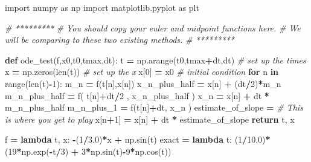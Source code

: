 \documentclass[
]{book}
\newenvironment{Shaded}{\begin{snugshade}}{\end{snugshade}}
\newcommand{\BuiltInTok}[1]{#1}
\newcommand{\CommentTok}[1]{\textcolor[rgb]{0.56,0.35,0.01}{\textit{#1}}}
\newcommand{\ControlFlowTok}[1]{\textcolor[rgb]{0.13,0.29,0.53}{\textbf{#1}}}
\newcommand{\DecValTok}[1]{\textcolor[rgb]{0.00,0.00,0.81}{#1}}
\newcommand{\FloatTok}[1]{\textcolor[rgb]{0.00,0.00,0.81}{#1}}
\newcommand{\ImportTok}[1]{#1}
\newcommand{\KeywordTok}[1]{\textcolor[rgb]{0.13,0.29,0.53}{\textbf{#1}}}
\newcommand{\NormalTok}[1]{#1}
\newcommand{\OperatorTok}[1]{\textcolor[rgb]{0.81,0.36,0.00}{\textbf{#1}}}
\theoremstyle{definition}
\theoremstyle{definition}
\theoremstyle{definition}
\theoremstyle{remark}
\begin{document}
\begin{Shaded}
\begin{Highlighting}[]
\ImportTok{import}\NormalTok{ numpy }\ImportTok{as}\NormalTok{ np}
\ImportTok{import}\NormalTok{ matplotlib.pyplot }\ImportTok{as}\NormalTok{ plt}

\CommentTok{\# *********}
\CommentTok{\# You should copy your euler and midpoint functions here. }
\CommentTok{\# We will be comparing to these two existing methods.}
\CommentTok{\# *********}

\KeywordTok{def}\NormalTok{ ode\_test(f,x0,t0,tmax,dt):}
\NormalTok{    t }\OperatorTok{=}\NormalTok{ np.arange(t0,tmax}\OperatorTok{+}\NormalTok{dt,dt) }\CommentTok{\# set up the times}
\NormalTok{    x }\OperatorTok{=}\NormalTok{ np.zeros(}\BuiltInTok{len}\NormalTok{(t)) }\CommentTok{\# set up the x}
\NormalTok{    x[}\DecValTok{0}\NormalTok{] }\OperatorTok{=}\NormalTok{ x0 }\CommentTok{\# initial condition}
    \ControlFlowTok{for}\NormalTok{ n }\KeywordTok{in} \BuiltInTok{range}\NormalTok{(}\BuiltInTok{len}\NormalTok{(t)}\OperatorTok{{-}}\DecValTok{1}\NormalTok{):}
\NormalTok{        m\_n }\OperatorTok{=}\NormalTok{ f(t[n],x[n])}
\NormalTok{        x\_n\_plus\_half }\OperatorTok{=}\NormalTok{ x[n] }\OperatorTok{+}\NormalTok{ (dt}\OperatorTok{/}\DecValTok{2}\NormalTok{)}\OperatorTok{*}\NormalTok{m\_n}
\NormalTok{        m\_n\_plus\_half }\OperatorTok{=}\NormalTok{ f( t[n]}\OperatorTok{+}\NormalTok{dt}\OperatorTok{/}\DecValTok{2}\NormalTok{ , x\_n\_plus\_half )}
\NormalTok{        x\_n }\OperatorTok{=}\NormalTok{ x[n] }\OperatorTok{+}\NormalTok{ dt }\OperatorTok{*}\NormalTok{ m\_n\_plus\_half}
\NormalTok{        m\_n\_plus\_1 }\OperatorTok{=}\NormalTok{ f(t[n]}\OperatorTok{+}\NormalTok{dt, x\_n )}
\NormalTok{        estimate\_of\_slope }\OperatorTok{=} \CommentTok{\# This is where you get to play}
\NormalTok{        x[n}\OperatorTok{+}\DecValTok{1}\NormalTok{] }\OperatorTok{=}\NormalTok{ x[n] }\OperatorTok{+}\NormalTok{ dt }\OperatorTok{*}\NormalTok{ estimate\_of\_slope}
    \ControlFlowTok{return}\NormalTok{ t, x}


\NormalTok{f }\OperatorTok{=} \KeywordTok{lambda}\NormalTok{ t, x: }\OperatorTok{{-}}\NormalTok{(}\DecValTok{1}\OperatorTok{/}\FloatTok{3.0}\NormalTok{)}\OperatorTok{*}\NormalTok{x }\OperatorTok{+}\NormalTok{ np.sin(t)}
\NormalTok{exact }\OperatorTok{=} \KeywordTok{lambda}\NormalTok{ t: (}\DecValTok{1}\OperatorTok{/}\FloatTok{10.0}\NormalTok{)}\OperatorTok{*}\NormalTok{(}\DecValTok{19}\OperatorTok{*}\NormalTok{np.exp(}\OperatorTok{{-}}\NormalTok{t}\OperatorTok{/}\DecValTok{3}\NormalTok{) }\OperatorTok{+} \DecValTok{3}\OperatorTok{*}\NormalTok{np.sin(t)}\OperatorTok{{-}}\DecValTok{9}\OperatorTok{*}\NormalTok{np.cos(t))}


\end{Highlighting}
\end{Shaded}
\end{document}
